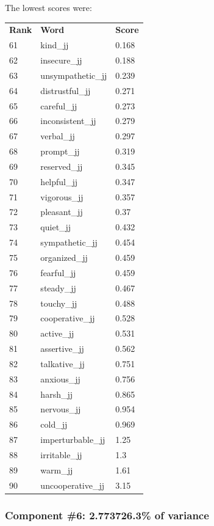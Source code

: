 \documentclass[10pt,letterpaper]{book}
\begin{document}
The lowest scores were:
\begin{tabular}{ l l l }
        \textbf{Rank} & \textbf{Word} & \textbf{Score} \\
        61 & kind\_jj & 0.168 \\
        62 & insecure\_jj & 0.188 \\
        63 & unsympathetic\_jj & 0.239 \\
        64 & distrustful\_jj & 0.271 \\
        65 & careful\_jj & 0.273 \\
        66 & inconsistent\_jj & 0.279 \\
        67 & verbal\_jj & 0.297 \\
        68 & prompt\_jj & 0.319 \\
        69 & reserved\_jj & 0.345 \\
        70 & helpful\_jj & 0.347 \\
        71 & vigorous\_jj & 0.357 \\
        72 & pleasant\_jj & 0.37 \\
        73 & quiet\_jj & 0.432 \\
        74 & sympathetic\_jj & 0.454 \\
        75 & organized\_jj & 0.459 \\
        76 & fearful\_jj & 0.459 \\
        77 & steady\_jj & 0.467 \\
        78 & touchy\_jj & 0.488 \\
        79 & cooperative\_jj & 0.528 \\
        80 & active\_jj & 0.531 \\
        81 & assertive\_jj & 0.562 \\
        82 & talkative\_jj & 0.751 \\
        83 & anxious\_jj & 0.756 \\
        84 & harsh\_jj & 0.865 \\
        85 & nervous\_jj & 0.954 \\
        86 & cold\_jj & 0.969 \\
        87 & imperturbable\_jj & 1.25 \\
        88 & irritable\_jj & 1.3 \\
        89 & warm\_jj & 1.61 \\
        90 & uncooperative\_jj & 3.15 \\
\end{tabular}
\subsubsection{Component \#6: 2.773726.3\% of variance}
\end{document}
